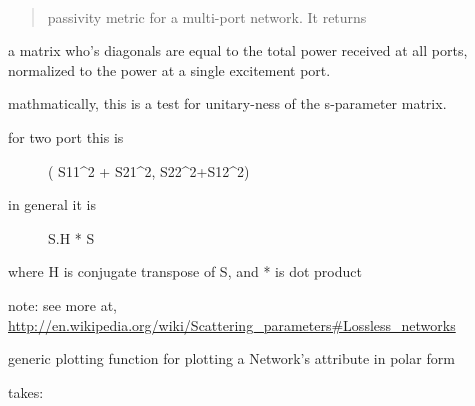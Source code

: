 \documentclass[letterpaper,10pt,english]{sphinxmanual}
\begin{document}
\begin{fulllineitems}

\begin{fulllineitems}
\label{api/mwavepy:mwavepy.network.Network.passivity}~\begin{quote}

passivity metric for a multi-port network. It returns
\end{quote}

a matrix who's diagonals are equal to the total power 
received at all ports, normalized to the power at a single
excitement  port.

mathmatically, this is a test for unitary-ness of the 
s-parameter matrix.
\begin{description}
\item[{for two port this is }] \leavevmode
( {\color{red}\bfseries{}\textbar{}}S11\textbar{}\textasciicircum{}2 + {\color{red}\bfseries{}\textbar{}}S21\textbar{}\textasciicircum{}2, {\color{red}\bfseries{}\textbar{}}S22\textbar{}\textasciicircum{}2+\textbar{}S12\textbar{}\textasciicircum{}2)

\item[{in general it is  }] \leavevmode
S.H * S

\end{description}

where H is conjugate transpose of S, and * is dot product

note:
see more at,
\href{http://en.wikipedia.org/wiki/Scattering\_parameters\#Lossless\_networks}{http://en.wikipedia.org/wiki/Scattering\_parameters\#Lossless\_networks}

\end{fulllineitems}


\begin{fulllineitems}
\label{api/mwavepy:mwavepy.network.Network.plot_polar_generic}
generic plotting function for plotting a Network's attribute
in polar form

takes:

\end{fulllineitems}



\end{fulllineitems}
\end{document}
